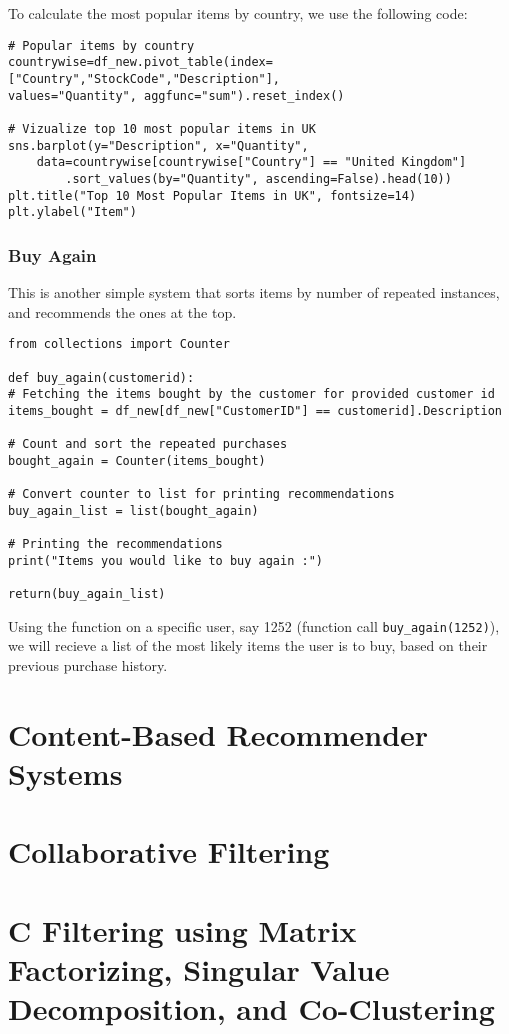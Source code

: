\documentclass{article}
\begin{document}
\noindent To calculate the most popular items by country, we use the following code:

\begin{lstlisting}
# Popular items by country
countrywise=df_new.pivot_table(index=["Country","StockCode","Description"],
values="Quantity", aggfunc="sum").reset_index()

# Vizualize top 10 most popular items in UK
sns.barplot(y="Description", x="Quantity",
    data=countrywise[countrywise["Country"] == "United Kingdom"]
        .sort_values(by="Quantity", ascending=False).head(10))
plt.title("Top 10 Most Popular Items in UK", fontsize=14)
plt.ylabel("Item")
\end{lstlisting}

\subsubsection{Buy Again}

This is another simple system that sorts items by number of repeated instances, and recommends the ones at the top.

\begin{lstlisting}
from collections import Counter

def buy_again(customerid):
# Fetching the items bought by the customer for provided customer id
items_bought = df_new[df_new["CustomerID"] == customerid].Description

# Count and sort the repeated purchases
bought_again = Counter(items_bought)

# Convert counter to list for printing recommendations
buy_again_list = list(bought_again)

# Printing the recommendations
print("Items you would like to buy again :")

return(buy_again_list)
\end{lstlisting}

\noindent Using the function on a specific user, say 1252 (function call \texttt{buy\_again(1252)}), we will recieve a list of the most likely items the user is to buy, based on their previous purchase history.

\section{Content-Based Recommender Systems}
\section{Collaborative Filtering}
\section{C Filtering using Matrix Factorizing, Singular Value Decomposition, and Co-Clustering}
\end{document}
